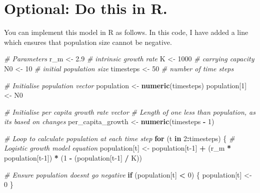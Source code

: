 \documentclass[
  a4paper]{book}
\newenvironment{Shaded}{\begin{snugshade}}{\end{snugshade}}
\newcommand{\CommentTok}[1]{\textcolor[rgb]{0.56,0.35,0.01}{\textit{#1}}}
\newcommand{\ControlFlowTok}[1]{\textcolor[rgb]{0.13,0.29,0.53}{\textbf{#1}}}
\newcommand{\DecValTok}[1]{\textcolor[rgb]{0.00,0.00,0.81}{#1}}
\newcommand{\FloatTok}[1]{\textcolor[rgb]{0.00,0.00,0.81}{#1}}
\newcommand{\FunctionTok}[1]{\textcolor[rgb]{0.13,0.29,0.53}{\textbf{#1}}}
\newcommand{\NormalTok}[1]{#1}
\newcommand{\OtherTok}[1]{\textcolor[rgb]{0.56,0.35,0.01}{#1}}
\newcommand{\SpecialCharTok}[1]{\textcolor[rgb]{0.81,0.36,0.00}{\textbf{#1}}}
\begin{document}
\section{Optional: Do this in R.}\label{optional-do-this-in-r.}

You can implement this model in R as follows.
In this code, I have added a line which ensures that population size cannot be negative.

\begin{Shaded}
\begin{Highlighting}[]
\CommentTok{\# Parameters}
\NormalTok{r\_m }\OtherTok{\textless{}{-}} \FloatTok{2.9}  \CommentTok{\# intrinsic growth rate}
\NormalTok{K }\OtherTok{\textless{}{-}} \DecValTok{1000}   \CommentTok{\# carrying capacity}
\NormalTok{N0 }\OtherTok{\textless{}{-}} \DecValTok{10}    \CommentTok{\# initial population size}
\NormalTok{timesteps }\OtherTok{\textless{}{-}} \DecValTok{50}  \CommentTok{\# number of time steps}

\CommentTok{\# Initialise population vector}
\NormalTok{population }\OtherTok{\textless{}{-}} \FunctionTok{numeric}\NormalTok{(timesteps)}
\NormalTok{population[}\DecValTok{1}\NormalTok{] }\OtherTok{\textless{}{-}}\NormalTok{ N0}

\CommentTok{\# Initialise per capita growth rate vector}
\CommentTok{\# Length of one less than population, as it\textquotesingle{}s based on changes}
\NormalTok{per\_capita\_growth }\OtherTok{\textless{}{-}} \FunctionTok{numeric}\NormalTok{(timesteps }\SpecialCharTok{{-}} \DecValTok{1}\NormalTok{)  }

\CommentTok{\# Loop to calculate population at each time step}
\ControlFlowTok{for}\NormalTok{ (t }\ControlFlowTok{in} \DecValTok{2}\SpecialCharTok{:}\NormalTok{timesteps) \{}
  \CommentTok{\# Logistic growth model equation}
\NormalTok{  population[t] }\OtherTok{\textless{}{-}}\NormalTok{ population[t}\DecValTok{{-}1}\NormalTok{] }\SpecialCharTok{+} 
\NormalTok{    (r\_m }\SpecialCharTok{*}\NormalTok{ population[t}\DecValTok{{-}1}\NormalTok{]) }\SpecialCharTok{*}\NormalTok{ (}\DecValTok{1} \SpecialCharTok{{-}}\NormalTok{ (population[t}\DecValTok{{-}1}\NormalTok{] }\SpecialCharTok{/}\NormalTok{ K))}
  
  \CommentTok{\# Ensure population doesn\textquotesingle{}t go negative}
  \ControlFlowTok{if}\NormalTok{ (population[t] }\SpecialCharTok{\textless{}} \DecValTok{0}\NormalTok{) \{}
\NormalTok{    population[t] }\OtherTok{\textless{}{-}} \DecValTok{0}
\NormalTok{  \}}
  

\end{Highlighting}
\end{Shaded}
\end{document}
